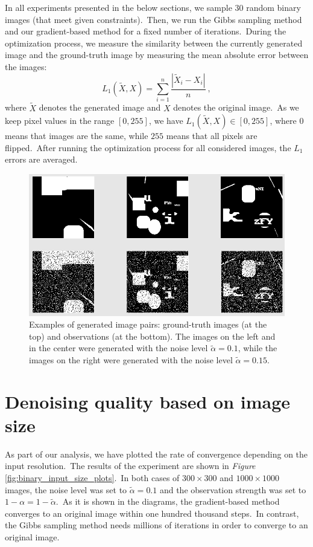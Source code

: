 \documentclass[shortabstract, english, lic]{iithesis}
\theoremstyle{default_theorem_style}\newtheorem{theorem}{Theorem}
\theoremstyle{default_theorem_style}\newtheorem{definition}{Definition}
\begin{document}
\noindent In all experiments presented in the below sections, we sample 30 random binary images
(that meet given constraints).\ Then, we run the Gibbs sampling method and our gradient-based method for a
fixed number of iterations.\ During the optimization process, we measure the similarity between the currently
generated image and the ground-truth image by measuring the mean absolute error between the images:
$$
L_1(\tilde{X}, X) = \sum\limits_{i = 1}^n \frac{|\tilde{X}_i - X_i|}{n}\ ,
$$
where $\tilde{X}$ denotes the generated image and $X$ denotes the original image.\ As we keep pixel values in the
range $[0, 255]$, we have $L_1(\tilde{X}, X) \in [0, 255]$, where $0$ means that images are the same, while
$255$ means that all pixels are flipped.\ After running the optimization process for all considered images, the
$L_1$ errors are averaged.\newline\newline\newline

\begin{figure}[H]
\centering
\includegraphics[scale=0.475]{binary_data_examples}
\caption{Examples of generated image pairs: ground-truth images (at the top) and observations (at the bottom).
The images on the left and in the center were generated with the noise level $\tilde{\alpha} = 0.1$, while the
images on the right were generated with the noise level $\tilde{\alpha} = 0.15$.}
\label{fig:binary_data_examples}
\end{figure}

\section{Denoising quality based on image size}

As part of our analysis, we have plotted the rate of convergence depending on the input resolution.\ The
results of the experiment are shown in \textit{Figure} \ref{fig:binary_input_size_plots}.\ In
both cases of $300{\times}300$ and $1000{\times}1000$ images, the noise level was set to $\tilde{\alpha} = 0.1$
and the observation strength was set to $1 - \alpha = 1 - \tilde{\alpha}$.\ As it is shown in the diagrams,
the gradient-based method converges to an original image within one hundred thousand steps.\ In contrast,
the Gibbs sampling method needs millions of iterations in order to converge to an original image.
\end{document}
